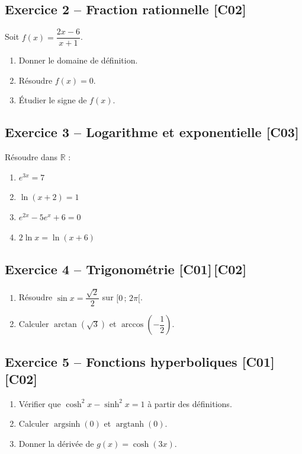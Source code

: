 \documentclass[a4paper,11pt]{article}
\begin{document}
\subsection*{Exercice 2 -- Fraction rationnelle \hfill {\normalsize\color{uimmred}[C02]}}
Soit $f(x) = \dfrac{2x - 6}{x + 1}$.
\begin{enumerate}[label=\alph*)]
  \item Donner le domaine de définition.
  \item Résoudre $f(x) = 0$.
  \item Étudier le signe de $f(x)$.
\end{enumerate}

\subsection*{Exercice 3 -- Logarithme et exponentielle \hfill {\normalsize\color{uimmred}[C03]}}
Résoudre dans $\mathbb{R}$ :
\begin{enumerate}[label=\alph*)]
  \item $e^{3x} = 7$
  \item $\ln(x + 2) = 1$
  \item $e^{2x} - 5e^x + 6 = 0$
  \item $2\ln x = \ln(x + 6)$
\end{enumerate}

\subsection*{Exercice 4 -- Trigonométrie \hfill {\normalsize\color{uimmred}[C01]\,[C02]}}
\begin{enumerate}[label=\alph*)]
  \item Résoudre $\sin x = \dfrac{\sqrt{2}}{2}$ sur $[0\,;\,2\pi[$.
  \item Calculer $\arctan(\sqrt{3})$ et $\arccos\!\left(-\dfrac{1}{2}\right)$.
\end{enumerate}

\subsection*{Exercice 5 -- Fonctions hyperboliques \hfill {\normalsize\color{uimmred}[C01]\,[C02]}}
\begin{enumerate}[label=\alph*)]
  \item Vérifier que $\cosh^2 x - \sinh^2 x = 1$ à partir des définitions.
  \item Calculer $\operatorname{argsinh}(0)$ et $\operatorname{argtanh}(0)$.
  \item Donner la dérivée de $g(x) = \cosh(3x)$.
\end{enumerate}
\end{document}

